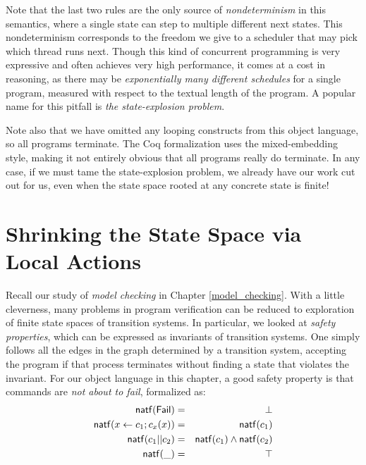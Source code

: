 \documentclass{amsbook}
\theoremstyle{definition}
\theoremstyle{remark}
\numberwithin{section}{chapter}
\numberwithin{equation}{chapter}
\begin{document}
Note that the last two rules are the only source of \emph{nondeterminism} in this semantics, where a single state can step to multiple different next states.
This nondeterminism corresponds to the freedom we give to a scheduler that may pick which thread runs next.
Though this kind of concurrent programming is very expressive and often achieves very high performance, it comes at a cost in reasoning, as there may be \emph{exponentially many different schedules} for a single program, measured with respect to the textual length of the program.
A popular name for this pitfall is \emph{the state-explosion problem}.

Note also that we have omitted any looping constructs from this object language, so all programs terminate.
The Coq formalization uses the mixed-embedding style, making it not entirely obvious that all programs really do terminate.
In any case, if we must tame the state-explosion problem, we already have our work cut out for us, even when the state space rooted at any concrete state is finite!


\section{Shrinking the State Space via Local Actions}

\newcommand{\natf}[1]{\mt{natf}(#1)}

Recall our study of \emph{model checking} in Chapter \ref{model_checking}.
With a little cleverness, many problems in program verification can be reduced to exploration of finite state spaces of transition systems.
In particular, we looked at \emph{safety properties}, which can be expressed as invariants of transition systems.
One simply follows all the edges in the graph determined by a transition system, accepting the program if that process terminates without finding a state that violates the invariant.
For our object language in this chapter, a good safety property is that commands are \emph{not about to fail}, formalized as:
\begin{eqnarray*}
  \natf{\mt{Fail}} &=& \bot \\
  \natf{x \leftarrow c_1; c_x(x)} &=& \natf{c_1} \\
  \natf{c_1 || c_2} &=& \natf{c_1} \land \natf{c_2} \\
  \natf{\_} &=& \top
\end{eqnarray*}
\end{document}
